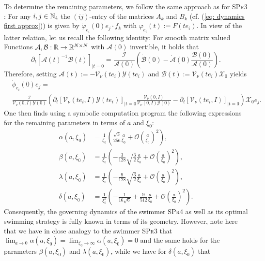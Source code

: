 To determine the remaining parameters, we follow the same approach as for \textsc{SPr3} \cite{Alouges2020}: For any $i, j \in \mathbb{N}_4$ the $(ij)$-entry of the matrices $A_k$ and $B_k$ (cf. (\ref{eq: dynamics first approx})) is given by $\dot{\varphi}_{e_i}(0)e_j \cdot f_k$ with $\varphi_{e_i}(t) := F(t e_i)$. In view of the latter relation, let us recall the following identity: For smooth matrix valued Functions $\mathcal{A}, \mathcal{B}: \mathbb{R} \to \mathbb{R}^{N \times N}$ with $\mathcal{A}(0)$ invertible, it holds that
\begin{equation}
\partial_t[\mathcal{A}(t)^{-1} \mathcal{B}(t)]_{\mid t = 0} = \frac{\mathcal{I}}{\mathcal{A}(0)}\left ( \dot{\mathcal{B}}(0) - \dot{\mathcal{A}}(0) \frac{\mathcal{B}(0)}{\mathcal{A}(0)}\right ).
\end{equation}
Therefore, setting $\mathcal{A}(t) := - \mathcal{V}_{\nu}(t e_i)\mathcal{Y}(t e_i)$ and $\mathcal{B}(t) := \mathcal{V}_{\nu}(t e_i) \mathcal{X}_0$ yields
\begin{align}
&\dot{\phi}_{e_i}(0)e_j = \nonumber\\
&\frac{\mathcal{I}}{\mathcal{V}_\nu (0, I) \mathcal{Y}(0)} \left ( \partial_t [\mathcal{V}_{\nu}(t e_i, I) \mathcal{Y}(t e_i)]_{\mid t = 0} \frac{\mathcal{V}_{\nu}(0, I)}{\mathcal{V}_{\nu}(0, I) \mathcal{Y}(0)} - \partial_t[\mathcal{V}_{\nu}(t e_i, I)]_{\mid t = 0}\right ) \mathcal{X}_0 e_j.
\end{align}
One then finds using a symbolic computation program the following expressions for the remaining parameters in terms of $a$ and $\xi_0$:
\begin{align}
\alpha(a, \xi_0) &= \frac{1}{\xi_0} \left (\frac{\sqrt{3}}{256} \frac{a}{\xi_0}+ \mathcal{O}\left (\frac{a}{\xi_0}\right )^2 \right ),\\
\beta(a, \xi_0) &=  \frac{1}{\xi_0} \left (-\frac{3}{128} \sqrt{\frac{3}{2}} \frac{a}{\xi_0} + \mathcal{O}\left (\frac{a}{\xi_0}\right )^2 \right ),\\
\lambda(a, \xi_0) &=  \frac{1}{\xi_0} \left ( - \frac{9}{128} \sqrt{\frac{3}{2}} \frac{a}{\xi_0}+ \mathcal{O}\left (\frac{a}{\xi_0}\right )^2 \right ),\\
\delta(a, \xi_0) &= \frac{1}{\xi_0^2} \left ( -\frac{1}{16 \sqrt{6}} + \frac{9}{512} \frac{a}{\xi_0}+ \mathcal{O}\left (\frac{a}{\xi_0}\right )^2 \right ).
\end{align}
Consequently, the governing dynamics of the swimmer \textsc{SPr4} as well as its optimal swimming strategy is fully known in terms of its geometry. However, note here that we have in close analogy to the swimmer \textsc{SPr3} \cite{Alouges2020} that $\lim_{a \to 0} \alpha(a, \xi_0) = \lim_{\xi_0 \to \infty} \alpha(a, \xi_0) = 0$ and the same holds for the parameters $\beta(a, \xi_0)$ and $\lambda(a, \xi_0)$, while we have for $\delta(a, \xi_0)$ that
